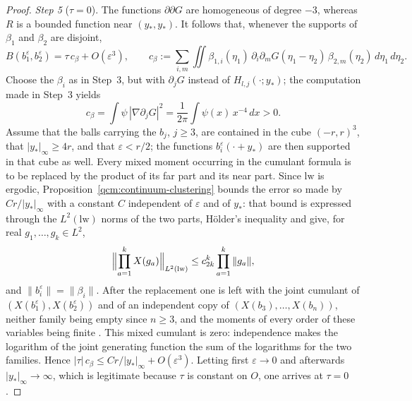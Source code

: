 \documentclass[11pt,letterpaper,reqno]{amsart}
\theoremstyle{definition}
\begin{document}
\begin{proof}
\emph{Step 5} ($\tau=0$).
The functions $\partial\partial G$ are homogeneous of degree $-3$, whereas $R$ is a bounded function near $(y_*,y_*)$.
It follows that, whenever the supports of $\beta_1$ and $\beta_2$ are disjoint,
\begin{equation*}
B(b_1^\varepsilon,b_2^\varepsilon)=\tau\,c_\beta+O(\varepsilon^3),\qquad c_\beta:=\sum_{i,m}\iint\beta_{1,i}(\eta_1)\,\partial_i\partial_mG(\eta_1-\eta_2)\,\beta_{2,m}(\eta_2)\,d\eta_1\,d\eta_2.
\end{equation*}
Choose the $\beta_i$ as in Step~3, but with $\partial_jG$ instead of $H_{l,j}(\cdot;y_*)$; the computation made in Step~3 yields
\begin{equation*}
c_\beta=\int\psi\,|\nabla\partial_jG|^2=\frac1{2\pi}\int\psi(x)\,x^{-4}\,dx>0.
\end{equation*}
Assume that the balls carrying the $b_j$, $j\ge3$, are contained in the cube $(-r,r)^3$, that $|y_*|_\infty\ge4r$, and that $\varepsilon<r/2$; the functions $b_i^\varepsilon(\cdot+y_*)$ are then supported in that cube as well.
Every mixed moment occurring in the cumulant formula is to be replaced by the product of its far part and its near part.
Since $\mathrm{lw}$ is ergodic, Proposition~\ref{qcm:continuum-clustering} bounds the error so made by $Cr/|y_*|_\infty$ with a constant $C$ independent of $\varepsilon$ and of $y_*$:
that bound is expressed through the $L^2(\mathrm{lw})$ norms of the two parts, H\"older's inequality and \cite[Proposition~5.1]{QEDConstruction} give, for real $g_1,\dots,g_k\in L^2$,
\begin{equation*}
\Bigl\|\prod_{a=1}^kX(g_a)\Bigr\|_{L^2(\mathrm{lw})}\le c_{2k}^k\prod_{a=1}^k\|g_a\|,
\end{equation*}
and $\|b_i^\varepsilon\|=\|\beta_i\|$.
After the replacement one is left with the joint cumulant of $(X(b_1^\varepsilon),X(b_2^\varepsilon))$ and of an independent copy of $(X(b_3),\dots,X(b_n))$, neither family being empty since $n\ge3$, and the moments of every order of these variables being finite \cite[Proposition~5.1]{QEDConstruction}.
This mixed cumulant is zero: independence makes the logarithm of the joint generating function the sum of the logarithms for the two families.
Hence $|\tau|\,c_\beta\le Cr/|y_*|_\infty+O(\varepsilon^3)$.
Letting first $\varepsilon\to0$ and afterwards $|y_*|_\infty\to\infty$, which is legitimate because $\tau$ is constant on $O$, one arrives at $\tau=0$.


\end{proof}
\end{document}
